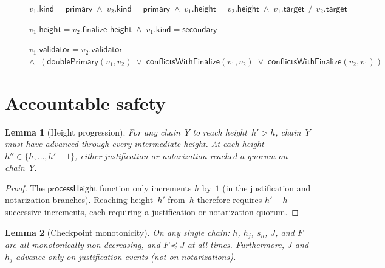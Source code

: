 \ifx\litemode\undefined\documentclass{article}\fi
\theoremstyle{plain}
\newtheorem{lemma}{Lemma}
\theoremstyle{definition}
\theoremstyle{remark}
\begin{document}
\begin{figure}[h!]
\begin{boxedminipage}{\textwidth}
\begin{algorithmic}[1]
 
  \State \Return $v_1.\mathsf{kind} = \mathsf{primary} \;\wedge\; v_2.\mathsf{kind} = \mathsf{primary} \;\wedge\; v_1.\mathsf{height} = v_2.\mathsf{height} \;\wedge\; v_1.\mathsf{target} \neq v_2.\mathsf{target}$
\EndFunction
\vspace{3pt}

 
  \State \Return $v_1.\mathsf{height} = v_2.\mathsf{finalize\_height} \;\wedge\; v_1.\mathsf{kind} = \mathsf{secondary}$
\EndFunction
\vspace{3pt}

  \State \Return $v_1.\mathsf{validator} = v_2.\mathsf{validator}$
  \Statex \hspace{3em}$\wedge\;\; (\textsf{doublePrimary}(v_1, v_2) \;\lor\; \textsf{conflictsWithFinalize}(v_1, v_2) \;\lor\; \textsf{conflictsWithFinalize}(v_2, v_1))$
\EndFunction

\end{algorithmic}
\end{boxedminipage}
\end{figure}


\section{Accountable safety}

\begin{lemma}[Height progression]\label{lem:heightprog}
For any chain~$Y$ to reach height~$h' > h$, chain~$Y$ must have advanced through every intermediate height.
At each height $h'' \in \{h, \ldots, h'-1\}$, either justification or notarization reached a quorum on chain~$Y$.
\end{lemma}

\begin{proof}
The $\textsf{processHeight}$ function only increments $h$ by~$1$ (in the justification and notarization branches).
Reaching height~$h'$ from~$h$ therefore requires $h' - h$ successive increments, each requiring a justification or notarization quorum.
\end{proof}

\begin{lemma}[Checkpoint monotonicity]\label{lem:slotmono}
On any single chain: $h$, $h_j$, $s_n$, $J$, and $F$ are all monotonically non-decreasing, and $F \preceq J$ at all times.
Furthermore, $J$ and $h_j$ advance only on justification events (not on notarizations).
\end{lemma}
\end{document}
